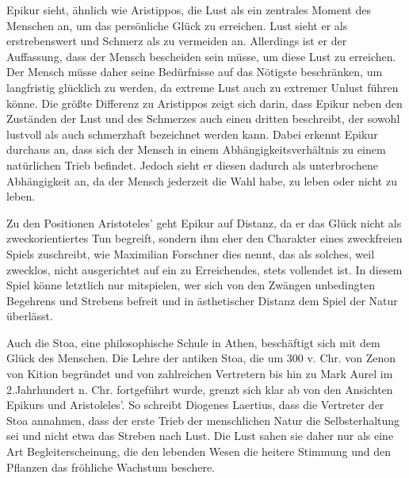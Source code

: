 Epikur sieht, ähnlich wie Aristippos, die Lust als ein zentrales Moment des Menschen an, um das persönliche Glück zu erreichen. 
Lust sieht er als erstrebenswert und Schmerz als zu vermeiden an. 
Allerdings ist er der Auffassung, dass der Mensch bescheiden sein müsse, um diese Lust zu erreichen.
Der Mensch müsse daher seine Bedürfnisse auf das Nötigste beschränken, um langfristig glücklich zu werden, da extreme Lust auch zu extremer Unlust führen könne.
Die größte Differenz zu Aristippos zeigt sich darin, dass Epikur neben den Zuständen der Lust und des Schmerzes auch einen dritten beschreibt, der sowohl lustvoll als auch schmerzhaft bezeichnet werden kann\cite{MF93, S.32}. 
Dabei erkennt Epikur durchaus an, dass sich der Mensch in einem Abhängigkeitsverhältnis zu einem natürlichen Trieb befindet. 
Jedoch sieht er diesen dadurch als unterbrochene Abhängigkeit an, da der Mensch jederzeit die Wahl habe, zu leben oder nicht zu leben\cite{MF93, S.36}.

Zu den Positionen Aristoteles' geht Epikur auf Distanz, da er das Glück nicht als zweckorientiertes Tun begreift, sondern ihm eher den Charakter eines \glqq zweckfreien Spiels\grqq{} zuschreibt, wie Maximilian Forschner dies nennt, \glqq das als solches, weil zwecklos, nicht ausgerichtet auf ein zu Erreichendes, stets vollendet ist.\grqq{}\cite{MF93, S.44}
In diesem \glqq Spiel\grqq{} könne letztlich nur mitspielen, wer sich von den \glqq Zwängen unbedingten Begehrens und Strebens befreit und in ästhetischer Distanz dem Spiel der Natur überlässt.\grqq{}\cite{MF93, S.44}
 
Auch die Stoa, eine philosophische Schule in Athen, beschäftigt sich mit dem Glück des Menschen. 
Die Lehre der antiken Stoa, die um 300 v. Chr. von Zenon von Kition begründet und von zahlreichen Vertretern bis hin zu Mark Aurel im 2.Jahrhundert n. Chr. fortgeführt wurde, grenzt sich klar ab von den Ansichten Epikurs und Aristoleles'. 
So schreibt Diogenes Laertius, dass die Vertreter der Stoa annahmen, dass der erste Trieb der menschlichen Natur die Selbsterhaltung sei und nicht etwa das Streben nach Lust\cite{DL67, Siebentes Buch S.48}.
Die Lust sahen sie daher nur als eine Art Begleiterscheinung, die \glqq den lebenden Wesen die heitere Stimmung und den Pflanzen das fröhliche Wachstum\grqq{} beschere. 

